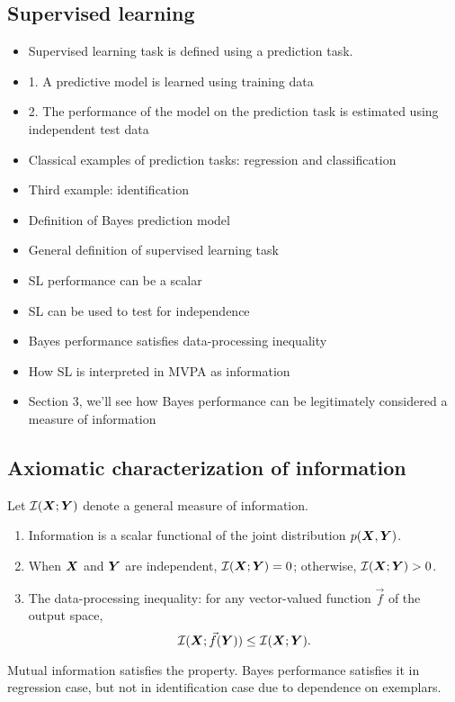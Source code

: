 \documentclass[12pt]{article}
\begin{document}
\subsection{Supervised learning}

\begin{itemize}
\item Supervised learning task is defined using a prediction task.
\item 1. A predictive model is learned using training data
\item 2. The performance of the model on the prediction task is estimated using independent test data
\item Classical examples of prediction tasks: regression and classification
\item Third example: identification
\item Definition of Bayes prediction model
\item General definition of supervised learning task
\item SL performance can be a scalar
\item SL can be used to test for independence
\item Bayes performance satisfies data-processing inequality
\item How SL is interpreted in MVPA as information
\item Section 3, we'll see how Bayes performance can be legitimately considered a measure of information
\end{itemize}

\subsection{Axiomatic characterization of information}

Let $\mathcal{I}(\boldsymbol{X}; \boldsymbol{Y})$ denote a general measure of information.
\begin{enumerate}
\item Information is a scalar functional of the joint distribution $p(\boldsymbol{X}, \boldsymbol{Y})$.
\item When $\boldsymbol{X}$ and $\boldsymbol{Y}$ are independent, $\mathcal{I}(\boldsymbol{X}; \boldsymbol{Y}) = 0$; otherwise, $\mathcal{I}(\boldsymbol{X}; \boldsymbol{Y}) > 0$.
\item The data-processing inequality: for any vector-valued function $\vec{f}$ of the output space,
\[
\mathcal{I}(\boldsymbol{X}; \vec{f}(\boldsymbol{Y})) \leq \mathcal{I}(\boldsymbol{X}; \boldsymbol{Y}).
\]
\end{enumerate}

Mutual information satisfies the property.  Bayes performance
satisfies it in regression case, but not in identification case due to
dependence on exemplars.
\end{document}
